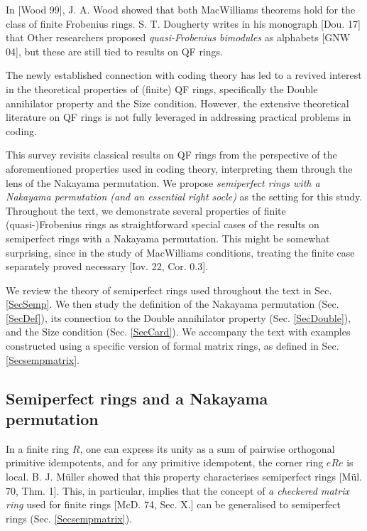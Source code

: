 \documentclass[11pt]{article}
\theoremstyle{plain}
\theoremstyle{remark}
\theoremstyle{plain}
\begin{document}
\smallskip 

In [Wood 99], J. A. Wood showed that both MacWilliams theorems hold for the class of finite Frobenius rings. S. T. Dougherty writes in his monograph [Dou. 17] that  Other researchers proposed \textit{quasi-Frobenius bimodules} as alphabets [GNW 04], but these are still tied to results on QF rings. 

The newly established connection with coding theory has led to a revived interest in the theoretical properties of (finite) QF rings, specifically the Double annihilator property and the Size condition. However, the extensive theoretical literature on QF rings is not fully leveraged in addressing practical problems in coding.

This survey revisits classical results on QF rings from the perspective of the aforementioned properties used in coding theory, interpreting them through the lens of the Nakayama permutation. We propose \textit{semiperfect rings with a Nakayama permutation (and an essential right socle)} as the setting for this study. Throughout the text, we demonstrate several properties of finite (quasi-)Frobenius rings as straightforward special cases of the results on semiperfect rings with a Nakayama permutation. This might be somewhat surprising, since in the study of MacWilliams conditions, treating the finite case separately proved necessary [Iov. 22, Cor. 0.3].

\smallskip 

We review the theory of semiperfect rings used throughout the text in Sec. \ref{SecSemp}. We then study the definition of the Nakayama permutation (Sec. \ref{SecDef}), its connection to the Double annihilator property (Sec. \ref{SecDouble}), and the Size condition (Sec. \ref{SecCard}). We accompany the text with examples constructed using a specific version of formal matrix rings, as defined in Sec. \ref{Secsempmatrix}.

\subsection{Semiperfect rings and a Nakayama permutation}



In a finite ring $R$, one can express its unity as a sum of pairwise orthogonal primitive idempotents, and for any primitive idempotent, the corner ring $eRe$ is local.  B. J. Müller showed that this property characterises semiperfect rings [Mül. 70, Thm. 1]. This, in particular, implies that the concept of \textit{a checkered matrix ring} used for finite rings [McD. 74, Sec. X.] can be generalised to semiperfect rings (Sec. \ref{Secsempmatrix}). 
\end{document}
